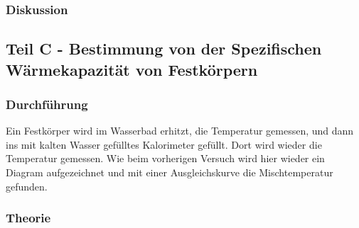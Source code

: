 \documentclass[11pt,a4paper]{article}
\begin{document}
%



\subsubsection{Diskussion}



\subsection{Teil C - Bestimmung von der Spezifischen W\"armekapazit\"at von Festk\"orpern}

\subsubsection{Durchf\"uhrung}

Ein Festk\"orper wird im Wasserbad erhitzt, die Temperatur gemessen, und dann ins mit kalten Wasser gef\"ulltes Kalorimeter gef\"ullt. Dort wird wieder die Temperatur gemessen. Wie beim vorherigen Versuch wird hier wieder ein Diagram aufgezeichnet und mit einer Ausgleichskurve die Mischtemperatur gefunden. 

\subsubsection{Theorie}
\end{document}
